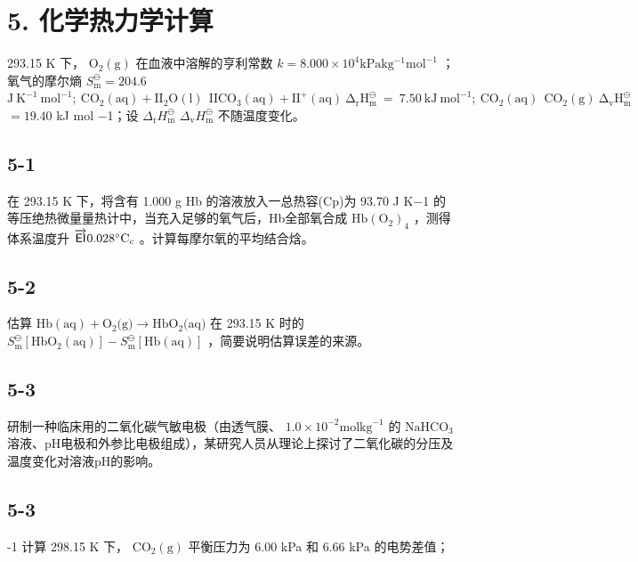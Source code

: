\section*{5. 化学热力学计算}
293.15 K 下， $\mathrm { O _ { 2 } ( g ) }$ 在⾎液中溶解的亨利常数 $k = 8 . 0 0 0 \times 1 0 ^ { 4 } \mathrm { k P a k g ^ { - 1 } m o l ^ { - 1 } }$ ；氧⽓的摩尔熵 $S _ { \mathrm { m } } ^ { \ominus } = 2 0 4 . 6$ $\mathrm { J \ K ^ { - 1 } \ m o l ^ { - 1 } ; ~ C O _ { 2 } ( a q ) + \mathrm { I I _ { 2 } O ( l ) ~  ~ I I C O _ { 3 } ( a q ) + \mathrm { I I ^ { + } ( a q ) ~ \Delta _ { r } H _ { m } ^ { \ominus } ~ = ~ 7 . 5 0 ~ k J ~ m o l ^ { - 1 } ; ~ C O _ { 2 } ( a q ) ~  ~ C O _ { 2 } ( g ) ~ \Delta _ { v } H _ { m } ^ { \ominus } } } }$ $= 1 9 . 4 0$ kJ $\mathrm { m o l }$ −1；设 $\Delta _ { \mathrm { r } } H _ { \mathrm { m } } ^ { \ominus }$ $\Delta _ { \mathrm { v } } H _ { \mathrm { m } } ^ { \ominus }$ 不随温度变化。

\subsection*{5-1}
在 293.15 K 下，将含有 1.000 g Hb 的溶液放⼊⼀总热容(Cp)为 93.70 J K−1 的等压绝热微量量热计中，当充⼊⾜够的氧⽓后，Hb全部氧合成 $\mathrm { H b ( O _ { 2 } ) _ { 4 } }$ ，测得体系温度升 $\overrightarrow { \sf E I } 0 . 0 2 8 ^ { \circ } \mathrm { C } _ { c }$ 。计算每摩尔氧的平均结合焓。

\subsection*{5-2}
估算 $\mathrm { H b ( a q ) } + \mathrm { O } _ { 2 } ( \mathrm { g ) } \to \mathrm { H b O } _ { 2 } ( \mathrm { a q ) }$ 在 293.15 K 时的 $S _ { \mathrm { m } } ^ { \ominus } [ \mathrm { H b O } _ { 2 } ( \mathrm { a q } ) ] { - } S _ { \mathrm { m } } ^ { \ominus } [ \mathrm { H b } ( \mathrm { a q } ) ]$ ，简要说明估算误差的来源。

\subsection*{5-3}
研制⼀种临床⽤的⼆氧化碳⽓敏电极（由透⽓膜、 $1 . 0 { \times } 1 0 ^ { - 2 } \mathrm { m o l } \mathrm { k g } ^ { - 1 }$ 的 $\mathrm { N a H C O _ { 3 } }$ 溶液、pH电极和外参⽐电极组成），某研究⼈员从理论上探讨了⼆氧化碳的分压及温度变化对溶液pH的影响。

\subsection*{5-3}
-1 计算 298.15 K 下， $\mathrm { C O _ { 2 } ( g ) }$ 平衡压⼒为 6.00 kPa 和 6.66 kPa 的电势差值；

